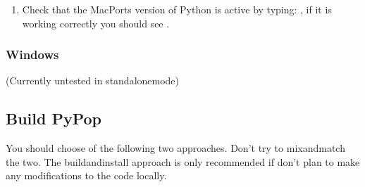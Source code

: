 \documentclass[letterpaper,10pt,english,openany,oneside]{sphinxmanual}
\begin{document}
\begin{enumerate}
\item {} 
\sphinxAtStartPar
Check that the MacPorts version of Python is active by typing:
, if it is working correctly you should see
.

\end{enumerate}


\subsubsection{Windows}
\label{\detokenize{docs/guide-chapter-contributing:windows}}
\sphinxAtStartPar
(Currently untested in standalone\sphinxhyphen{}mode)


\subsection{Build PyPop}
\label{\detokenize{docs/guide-chapter-contributing:build-pypop}}
\sphinxAtStartPar
You should choose  of the following two approaches. Don’t try
to mix\sphinxhyphen{}and\sphinxhyphen{}match the two. The build\sphinxhyphen{}and\sphinxhyphen{}install approach is only
recommended if don’t plan to make any modifications to the code
locally.
\end{document}
